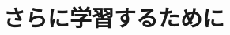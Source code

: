 \documentclass[uplatex,dvipdfmx]{jsarticle} \usepackage{mystyle}%
\begin{document}
 \nocite{中公67:デカルト}
 \nocite{山岡龍一95:ロック}
 \nocite{田中浩98:ホッブズ}
 \nocite{浜林正夫96:ロック}
 \nocite{太田義器95:グロティウス}


\section{さらに学習するために}



\ifx\mybook\undefined


\end{document}
